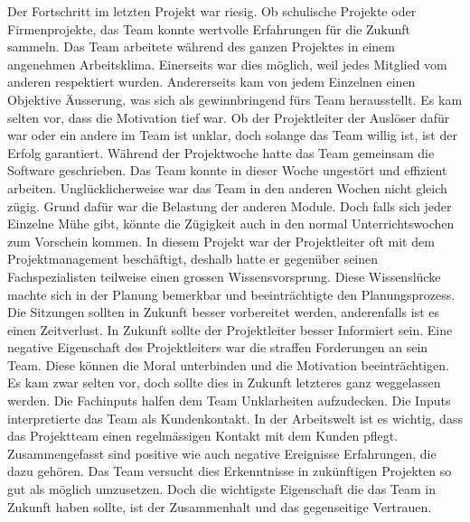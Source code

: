 Der Fortschritt im letzten Projekt war riesig. Ob schulische Projekte oder Firmenprojekte, das Team konnte wertvolle Erfahrungen für die Zukunft sammeln. Das Team arbeitete während des ganzen Projektes in einem angenehmen Arbeitsklima. Einerseits war dies möglich, weil jedes Mitglied vom anderen respektiert wurden. Andererseits kam von jedem Einzelnen einen Objektive Äusserung, was sich als gewinnbringend fürs Team herausstellt. Es kam selten vor, dass die Motivation tief war. Ob der Projektleiter der Auslöser dafür war oder ein andere im Team ist unklar, doch solange das Team willig ist, ist der Erfolg garantiert. 
Während der Projektwoche hatte das Team gemeinsam die Software geschrieben. Das Team konnte in dieser Woche ungestört und effizient arbeiten. Unglücklicherweise war das Team in den anderen Wochen nicht gleich zügig. Grund dafür war die Belastung der anderen Module. Doch falls sich jeder Einzelne Mühe gibt, könnte die Zügigkeit auch in den normal Unterrichtswochen zum Vorschein kommen.  
In diesem Projekt war der Projektleiter oft mit dem Projektmanagement beschäftigt, deshalb hatte er gegenüber seinen Fachspezialisten teilweise einen grossen Wissensvorsprung. Diese Wissenslücke machte sich in der Planung bemerkbar und beeinträchtigte den Planungsprozess. Die Sitzungen sollten in Zukunft besser vorbereitet werden, anderenfalls ist es einen Zeitverlust. In Zukunft sollte der Projektleiter besser Informiert sein. Eine negative Eigenschaft des Projektleiters war die straffen Forderungen an sein Team. Diese können die Moral unterbinden und die Motivation beeinträchtigen. Es kam zwar selten vor, doch sollte dies in Zukunft letzteres ganz weggelassen werden. 
Die Fachinputs halfen dem Team Unklarheiten aufzudecken. Die Inputs interpretierte das Team als Kundenkontakt. In der Arbeitswelt ist es wichtig, dass das Projektteam einen regelmässigen Kontakt mit dem Kunden pflegt.
Zusammengefasst sind positive wie auch negative Ereignisse Erfahrungen, die dazu gehören. Das Team versucht dies Erkenntnisse in zukünftigen Projekten so gut als möglich umzusetzen. Doch die wichtigste Eigenschaft die das Team in Zukunft haben sollte, ist der Zusammenhalt und das gegenseitige Vertrauen.
